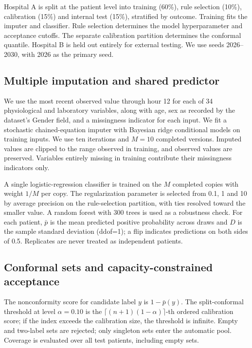 Hospital A is split at the patient level into training (60\%), rule selection (10\%), calibration (15\%) and internal test (15\%), stratified by outcome. Training fits the imputer and classifier. Rule selection determines the model hyperparameter and acceptance cutoffs. The separate calibration partition determines the conformal quantile. Hospital B is held out entirely for external testing. We use seeds 2026--2030, with 2026 as the primary seed.

\subsection{Multiple imputation and shared predictor}

We use the most recent observed value through hour 12 for each of 34 physiological and laboratory variables, along with age, sex as recorded by the dataset's Gender field, and a missingness indicator for each input. We fit a stochastic chained-equation imputer \cite{vanbuuren2011mice} with Bayesian ridge conditional models on training inputs. We use ten iterations and $M=10$ completed versions. Imputed values are clipped to the range observed in training, and observed values are preserved. Variables entirely missing in training contribute their missingness indicators only.

A single logistic-regression classifier is trained on the $M$ completed copies with weight $1/M$ per copy. The regularization parameter is selected from 0.1, 1 and 10 by average precision on the rule-selection partition, with ties resolved toward the smaller value. A random forest with 300 trees is used as a robustness check. For each patient, $\bar p$ is the mean predicted positive probability across draws and $D$ is the sample standard deviation (ddof=1); a flip indicates predictions on both sides of 0.5. Replicates are never treated as independent patients.

\subsection{Conformal sets and capacity-constrained acceptance}

The nonconformity score for candidate label $y$ is $1-\bar p(y)$. The split-conformal threshold at level $\alpha=0.10$ is the $\lceil (n+1)(1-\alpha)\rceil$-th ordered calibration score; if the index exceeds the calibration size, the threshold is infinite. Empty and two-label sets are rejected; only singleton sets enter the automatic pool. Coverage is evaluated over all test patients, including empty sets.

